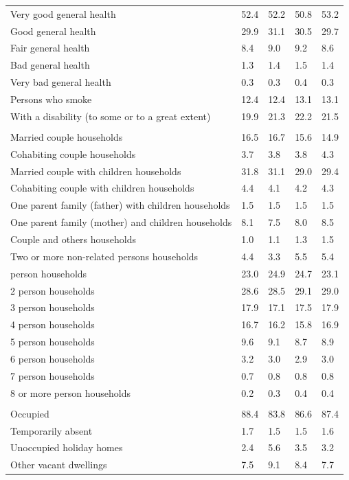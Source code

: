 \documentclass{article}
\begin{document}
\begin{table}[h]
\begin{tabular}{KTTTT}
    \hline
Very good general health & 52.4& 52.2&50.8& 53.2\\
Good general health & 29.9& 31.1& 30.5& 29.7\\
Fair general health & 8.4& 9.0&9.2& 8.6\\
Bad general health & 1.3& 1.4&1.5& 1.4\\
Very bad general health & 0.3& 0.3&0.4& 0.3\\
    \hline
Persons who smoke & 12.4& 12.4&13.1& 13.1\\
    \hline
With a disability (to some or to a great extent) & 19.9& 21.3&22.2& 21.5\\
\hline
    \\ 
    \hline
Married couple households & 16.5& 16.7& 15.6& 14.9\\
Cohabiting couple households & 3.7& 3.8& 3.8& 4.3\\
Married couple with children households & 31.8& 31.1& 29.0& 29.4\\
Cohabiting couple with children households & 4.4& 4.1& 4.2& 4.3\\
One parent family (father) with  children households & 1.5& 1.5& 1.5& 1.5\\
One parent family (mother) and children households & 8.1& 7.5& 8.0& 8.5\\
Couple and others households  & 1.0& 1.1& 1.3& 1.5\\
Two or more non-related persons households & 4.4& 3.3& 5.5& 5.4\\
     person households & 23.0& 24.9& 24.7& 23.1\\
2 person households & 28.6& 28.5& 29.1& 29.0\\
3 person households & 17.9& 17.1& 17.5& 17.9\\
4 person households & 16.7& 16.2& 15.8& 16.9\\
5 person households & 9.6& 9.1& 8.7& 8.9\\
6 person households & 3.2& 3.0& 2.9& 3.0\\
7 person households & 0.7& 0.8& 0.8& 0.8\\
8 or more person households & 0.2& 0.3& 0.4& 0.4\\
\hline
    \\ 
    \hline
Occupied & 88.4& 83.8& 86.6& 87.4\\
Temporarily absent & 1.7& 1.5& 1.5& 1.6\\
Unoccupied holiday homes & 2.4& 5.6& 3.5& 3.2\\
Other vacant dwellings & 7.5& 9.1& 8.4& 7.7\\
\hline
\end{tabular}
\end{table}
\end{document}
